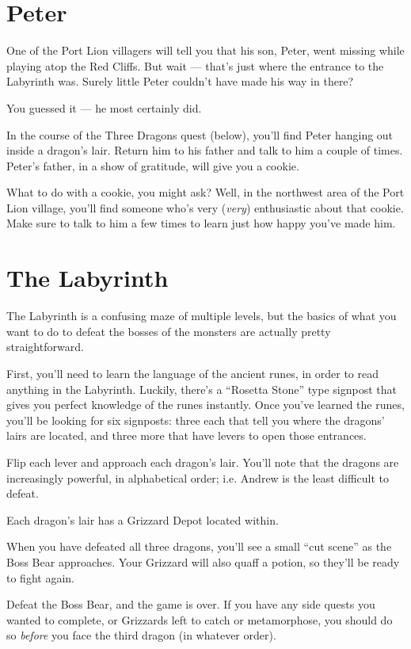 \documentclass[10pt,twocolumn]{memoir}
\begin{document}
\section{Peter}

One of the Port  Lion villagers will tell you that  his son, Peter, went
missing while  playing atop  the Red  Cliffs. But  wait ---  that's just
where the  entrance to the  Labyrinth was. Surely little  Peter couldn't
have made his way in there?

You guessed it --- he most certainly did.

In the  course of  the Three  Dragons quest  (below), you'll  find Peter
hanging out inside a dragon's lair. Return him to his father and talk to
him a couple of times. Peter's father, in a show of gratitude, will give
you a cookie.

What to do with a cookie, you  might ask? Well, in the northwest area of
the  Port Lion  village, you'll  find someone  who's very  (\emph{very})
enthusiastic about that cookie. Make sure to  talk to him a few times to
learn just how happy you've made him.

\section{The Labyrinth}

The Labyrinth is a confusing maze  of multiple levels, but the basics of
what you want  to do to defeat  the bosses of the  monsters are actually
pretty straightforward.

First, you'll need to learn the  language of the ancient runes, in order
to read anything in the  Labyrinth. Luckily, there's a ``Rosetta Stone''
type signpost that  gives you perfect knowledge of  the runes instantly.
Once  you've learned  the runes,  you'll be  looking for  six signposts:
three each that tell you where the dragons' lairs are located, and three
more that have levers to open those entrances.

Flip each  lever and approach each  dragon's lair. You'll note  that the
dragons are increasingly powerful, in alphabetical order; i.e. Andrew is
the least difficult to defeat.

Each dragon's lair has a Grizzard Depot located within.

When  you have  defeated all  three dragons,  you'll see  a small  ``cut
scene''  as the  Boss Bear  approaches.  Your Grizzard  will also  quaff
a potion, so they'll be ready to fight again.

Defeat the Boss Bear, and the game  is over. If you have any side quests
you wanted to complete, or Grizzards  left to catch or metamorphose, you
should  do so  \emph{before}  you  face the  third  dragon (in  whatever
order).
\end{document}
